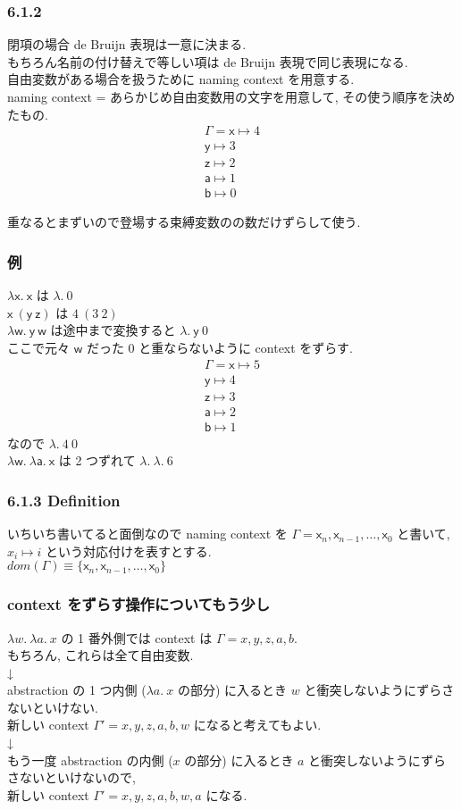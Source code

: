 \documentclass[13pt,dvipdfm]{beamer}
\begin{document}
\frame
{
  \frametitle{6.1.2}
  閉項の場合 de Bruijn 表現は一意に決まる.\\
  もちろん名前の付け替えで等しい項は de Bruijn 表現で同じ表現になる.\\
  自由変数がある場合を扱うために naming context を用意する.\\
  naming context = あらかじめ自由変数用の文字を用意して, その使う順序を決めたもの.\\
  \begin{align*}
    \Gamma = \mathsf{x} \mapsto 4 \\
    \mathsf{y} \mapsto 3 \\
    \mathsf{z} \mapsto 2 \\
    \mathsf{a} \mapsto 1 \\
    \mathsf{b} \mapsto 0
  \end{align*}

  重なるとまずいので登場する束縛変数のの数だけずらして使う.
}

\frame
{
  \frametitle{例}
  $\lambda \mathsf{x}.\ \mathsf{x}$ は $\lambda.\ 0$\\
  $\mathsf{x}\ (\mathsf{y}\ \mathsf{z})$ は $4\ (3\ 2)$\\
  $\lambda \mathsf{w}.\ \mathsf{y}\ \mathsf{w}$ は途中まで変換すると $\lambda.\ \mathsf{y}\ 0$\\
  ここで元々 $\mathsf{w}$ だった 0 と重ならないように context をずらす.
  \begin{align*}
    \Gamma = \mathsf{x} \mapsto 5 \\
    \mathsf{y} \mapsto 4 \\
    \mathsf{z} \mapsto 3 \\
    \mathsf{a} \mapsto 2 \\
    \mathsf{b} \mapsto 1
  \end{align*}
  なので $\lambda.\ 4\ 0$\\
  $\lambda \mathsf{w}.\ \lambda \mathsf{a}.\ \mathsf{x}$ は 2 つずれて $\lambda.\ \lambda.\ 6$
}

\frame
{
  \frametitle{6.1.3 Definition}
  いちいち書いてると面倒なので naming context を
  $\Gamma = \mathsf{x}_n, \mathsf{x}_{n-1},\dots,\mathsf{x}_0$
  と書いて, $x_i \mapsto i$ という対応付けを表すとする.\\
  $dom(\Gamma) \equiv \{\mathsf{x}_n, \mathsf{x}_{n-1},\dots,\mathsf{x}_0\}$
}

\frame
{
  \frametitle{context をずらす操作についてもう少し}
  $\lambda w.\ \lambda a.\ x$ の 1 番外側では context は $\Gamma = x, y, z, a, b$.\\
  もちろん, これらは全て自由変数.\\
  ↓\\
  abstraction の 1 つ内側 ($\lambda a.\ x$ の部分) に入るとき $w$ と衝突しないようにずらさないといけない.\\
  新しい context $\Gamma' = x, y, z, a, b, w$ になると考えてもよい.\\
  ↓\\
  もう一度 abstraction の内側 ($x$ の部分) に入るとき $a$ と衝突しないようにずらさないといけないので,\\
  新しい context $\Gamma' = x, y, z, a, b, w, a$ になる.
} \label{frame:context_shift}
\end{document}

